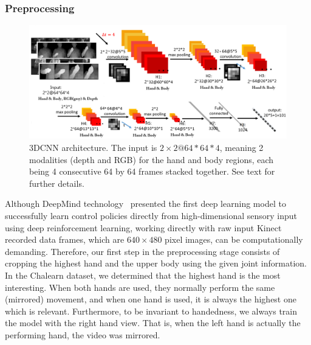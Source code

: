\subsubsection{Preprocessing}\label{3d_preproc}
\begin{figure}[t]
  \centering
  \includegraphics[width=.9\textwidth]{images/3DCNN_new}
\vspace*{-2mm}
  \caption{3DCNN architecture. The input is $2\times2@64\ast64\ast4$, meaning 2 modalities (depth and RGB)  for the hand and body regions,
each  being 4  consecutive 64 by 64 frames stacked together. See text for further details.
%
}
\label{3dcnn_architecture}
\end{figure}
Although DeepMind technology~\cite{mnih2013playing} presented the first deep learning model to successfully learn control policies directly from high-dimensional sensory input using deep reinforcement learning, working directly with raw input Kinect recorded data frames, which are $640 \times 480$ pixel images, can be computationally demanding.
Therefore, our first step in the preprocessing stage consists of cropping the highest hand and the upper body using the given joint information. In the Chalearn dataset, we determined that the highest hand is the most interesting. When both hands are used, they normally perform the same (mirrored) movement, and when one hand is used, it is always the highest one which is relevant.
Furthermore, to be invariant to handedness, we always train the model with the right hand view.
That is, when the left hand is actually the performing hand, the video was mirrored.


